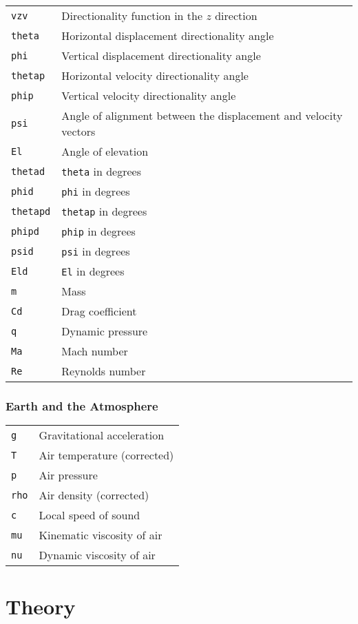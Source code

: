 \documentclass[11pt]{thesis}
\numberwithin{equation}{section}
\begin{document}
\begin{longtable}[l]{l l}
\texttt{vzv} & Directionality function in the $z$ direction \\
\texttt{theta} & Horizontal displacement directionality angle \\
\texttt{phi} & Vertical displacement directionality angle \\
\texttt{thetap} & Horizontal velocity directionality angle \\
\texttt{phip} & Vertical velocity directionality angle \\
\texttt{psi} & Angle of alignment between the displacement and velocity vectors \\
\texttt{El} & Angle of elevation \\
\texttt{thetad} & \texttt{theta} in degrees \\
\texttt{phid}  & \texttt{phi} in degrees\\
\texttt{thetapd} & \texttt{thetap} in degrees \\
\texttt{phipd} & \texttt{phip} in degrees \\
\texttt{psid} & \texttt{psi} in degrees \\
\texttt{Eld} & \texttt{El} in degrees \\
\texttt{m} & Mass \\
\texttt{Cd} & Drag coefficient \\
\texttt{q} & Dynamic pressure \\
\texttt{Ma} & Mach number \\
\texttt{Re} & Reynolds number
\end{longtable}
\subsubsection*{Earth and the Atmosphere}
\begin{longtable}[l]{l l}
\texttt{g} & Gravitational acceleration \\
\texttt{T} & Air temperature (corrected) \\
\texttt{p} & Air pressure \\
\texttt{rho} & Air density (corrected) \\
\texttt{c} & Local speed of sound \\
\texttt{mu} & Kinematic viscosity of air \\
\texttt{nu} & Dynamic viscosity of air 
\end{longtable}

\section*{Theory}
\end{document}
